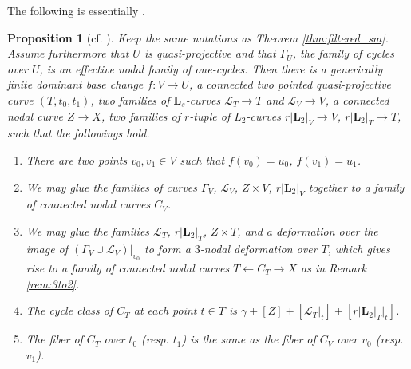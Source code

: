 \documentclass{amsart}
\newtheorem{prop}[theorem]{Proposition}
\theoremstyle{definition}
\theoremstyle{remark}
\begin{document}
The following is essentially \cite[Theorem 61]{Kollar_Tian}.
\begin{prop}[{cf. \cite[Theorem 61]{Kollar_Tian}}]\label{prop:addtodeform}
    Keep the same notations as Theorem \ref{thm:filtered_sm}. Assume furthermore that $U$ is quasi-projective and that $\Gamma_U$, the family of cycles over $U$, is an effective nodal family of one-cycles.
    Then there is a generically finite dominant base change $f: V \to U$, a connected two pointed quasi-projective curve $(T, t_0, t_1)$, two families of $\mathbf{L}_s$-curves $\mathcal{L}_T \to T$ and $\mathcal{L}_V \to V$, a connected nodal curve $Z \to X$, two families of $r$-tuple of $L_2$-curves $r|\mathbf{L}_2|_V \to V$, $r|\mathbf{L}_2|_T \to T$, such that the followings hold.
    \begin{enumerate}
        \item There are two points $v_0, v_1 \in V$ such that $f(v_0)=u_0$, $f(v_1)=u_1$.
        \item We may glue the families of curves $\Gamma_V$, $\mathcal{L}_V$, $Z\times V$, $r|\mathbf{L}_2|_V$ together to a family of \emph{connected} nodal curves $C_V$.
        \item We may glue the families $\mathcal{L}_T$, $r|\mathbf{L}_2|_T$, $Z\times T$, and a deformation over the image of $(\Gamma_V\cup \mathcal{L}_V)|_{v_0} $ to form a $3$-nodal deformation over $T$, which gives rise to a family of connected nodal curves $T\leftarrow C_T \to X$ as in Remark \ref{rem:3to2}.
        \item The cycle class of $C_T$ at each point $t \in T$ is $\gamma+[Z]+[\mathcal{L}_T|_t]+[r|\mathbf{L}_2|_T|_t]$.
        \item The fiber of $C_T$ over $t_0$ (resp. $t_1$) is the same as the fiber of $C_V$ over $v_0$ (resp. $v_1$).
     \end{enumerate}
\end{prop}
\end{document}
